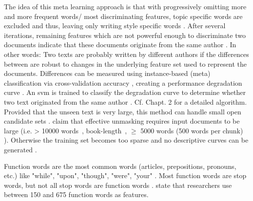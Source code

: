 \begin{definition}
    [Unmasking]
    The idea of this meta learning approach is that with progressively omitting more and more frequent words/ most discriminating features, 
    topic specific words are excluded and thus, leaving only writing style specific words \cite{stein_intrinsic_2011}.
    After several iterations, remaining features which are not powerful enough to discriminate two documents indicate that 
    these documents originate from the same author \cite{stein_intrinsic_2011,tyo_state_2022,bevendorff_divergence_based_2020}.
    In other words: 
    Two texts are probably written by different authors if the differences between are robust to changes in the underlying feature set used to represent the documents.
    Differences can be measured using instance-based (meta) classification via cross-validation accuracy \cite{koppel_authorship_2011,bevendorff_generalizing_2019,bevendorff_divergence_based_2020}, 
    creating a performance degradation curve \cite{tyo_state_2022}.
    An \ac{svm} is trained to classify the degradation curve to determine whether two text originated from the same author \cite{tyo_state_2022,bevendorff_generalizing_2019}.
    Cf. \cite{bevendorff_divergence_based_2020} Chapt. 2 for a detailed algorithm.
    Provided that the unseen text is very large, this method can handle small open candidate sets \cite{koppel_authorship_2011}.
    \citet{koppel_determining_2014,bevendorff_generalizing_2019} claim that effective unmasking requires input documents to be large 
    (i.e. > 10000 words~\cite{koppel_determining_2014}, book-length~\cite{bevendorff_generalizing_2019}, $\geq$ 5000 words (500 words per chunk) \cite{bevendorff_divergence_based_2020}).
    Otherwise the training set becomes too sparse and no descriptive curves can be generated \cite{bevendorff_generalizing_2019,bevendorff_divergence_based_2020}.
\end{definition}

\begin{definition}
    Function words are the most common words (articles, prepositions, pronouns, etc.) 
    like "while", "upon", "though", "were", "your" \cite{stamatatos_survey_2009,elmanarelbouanani_authorship_2014}.
    Most function words are stop words, but not all stop words are function words \cite{stein_intrinsic_2011}.
    \citet{elmanarelbouanani_authorship_2014} state that researchers use between 150 and 675 function words as features.
\end{definition}

